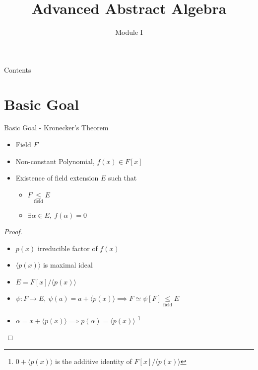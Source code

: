 \documentclass{beamer}
\title{Advanced Abstract Algebra}
\author{Module I}
\institute{Section 29 : Extension Fields}
\newcommand{\subfield}{\underset{\text{field}}{\le}}
\newcommand{\ideal}[1]{\langle #1 \rangle}
\begin{document}
\begin{frame}
\maketitle
\end{frame}


\begin{frame}{Contents}
\tableofcontents
\end{frame}

\section{Basic Goal}
\begin{frame}{Basic Goal - Kronecker's Theorem}
	\begin{itemize}
		\item Field $F$
		\item Non-constant Polynomial, $f(x) \in F[x]$
		\item Existence of field extension $E$ such that
		\begin{itemize}
			\item $F \subfield E$
			\item $\exists \alpha \in E,\ f(\alpha) = 0$
		\end{itemize}
	\end{itemize}
\begin{proof}
\begin{itemize}
	\item $p(x)$ irreducible factor of $f(x)$
	\item $\ideal{p(x)}$ is maximal ideal
	\item $E = F[x]/\ideal{p(x)}$
	\item $\psi : F \to E,\ \psi(a) = a+\ideal{p(x)} \implies F \simeq \psi[F] \subfield E$
	\item $\alpha = x + \ideal{p(x)} \implies p(\alpha) = \ideal{p(x)}$ \dag\footnote{$0+\ideal{p(x)}$ is the additive identity of $F[x]/\ideal{p(x)}$}
\end{itemize}
\end{proof}
\end{frame}
\end{document}
